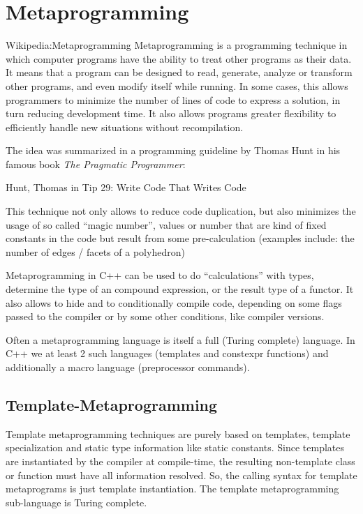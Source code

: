 \chapter{Metaprogramming}
\begin{zitat}{Wikipedia:Metaprogramming}
  Metaprogramming is a programming technique in which computer programs have the ability to treat other programs as their data.
  It means that a program can be designed to read, generate, analyze or transform other programs, and even modify itself while
  running. In some cases, this allows programmers to minimize the number of lines of code to express a solution, in turn reducing
  development time. It also allows programs greater flexibility to efficiently handle new situations without recompilation.
\end{zitat}

The idea was summarized in a programming guideline by Thomas Hunt in his famous book \emph{The Pragmatic Programmer}:
\begin{zitat}{Hunt, Thomas in \cite{hunt1999}}
  Tip 29: Write Code That Writes Code
\end{zitat}

This technique not only allows to reduce code duplication, but also minimizes the usage of so called ``magic number'', \ie values or number
that are kind of fixed constants in the code but result from some pre-calculation (examples include: the number of edges / facets of a polyhedron)

Metaprogramming in C++ can be used to do ``calculations'' with types, \eg determine the type of an compound expression, or the result type of
a functor. It also allows to hide and to conditionally compile code, depending on some flags passed to the compiler or by some other conditions,
like compiler versions.

Often a metaprogramming language is itself a full (Turing complete) language. In C++ we at least 2 such languages (templates and constexpr functions)
and additionally a macro language (preprocessor commands).

\section{Template-Metaprogramming}
Template metaprogramming techniques are purely based on templates, template specialization and static type information like static constants. Since
templates are instantiated by the compiler at compile-time, the resulting non-template class or function must have all information resolved. So, the
calling syntax for template metaprograms is just template instantiation. The template metaprogramming sub-language is Turing complete.

